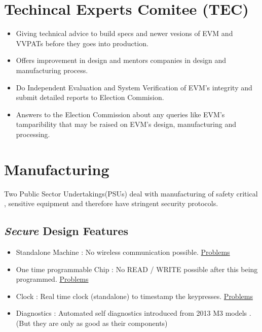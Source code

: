 \documentclass[12pt]{report}
\begin{document}
\section{Techincal Experts Comitee (TEC)}
\begin{itemize}
  \item Giving technical advice to build specs and newer vesions of EVM and VVPATs  before they goes into production.
  \item Offers improvement in design and mentors companies in design and manufacturing process.
  \item Do Independent Evaluation and System Verification of EVM's integrity and submit detailed reports to Election Commision.
  \item Answers to the Election Commission about any queries like EVM's tamparibility that may be raised on EVM's design, manufacturing and processing.
\end{itemize}

\section{Manufacturing}
Two Public Sector Undertakings(PSUs) deal with manufacturing of safety critical , sensitive equipment and therefore have stringent security protocols.
\subsection{\textit{Secure} Design Features}
\begin{itemize}
  \item Standalone Machine : No wireless communication possible. \hyperref[sec:standalone]{Problems}
  \item One time programmable Chip : No READ / WRITE possible after this being programmed. \hyperref[sec:otp]{Problems}
  \item Clock : Real time clock (standalone) to timestamp the keypresses. \hyperref[sec:clock]{Problems}
  \item Diagnostics : Automated self diagnostics introduced from 2013 M3 models . (But they are only as good as their components)
\end{itemize}
\end{document}
